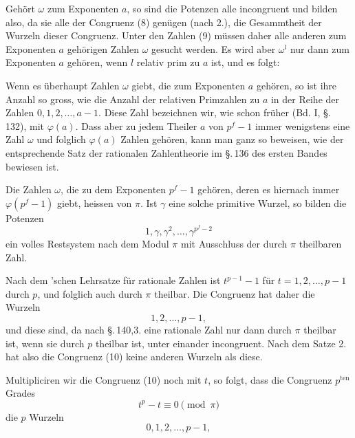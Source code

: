 Gehört $\omega$ zum Exponenten $a$, so sind die Potenzen
alle incongruent und bilden also, da sie alle der Congruenz (8) genügen (nach 2.), die Gesammtheit der Wurzeln dieser Congruenz. Unter den Zahlen (9) müssen daher alle anderen zum Exponenten $a$ gehörigen Zahlen $\omega$ gesucht werden. Es wird aber $\omega^l$ nur dann zum Exponenten $a$ gehören, wenn $l$ relativ prim zu $a$ ist, und es folgt:

Wenn es überhaupt Zahlen $\omega$ giebt, die zum Exponenten $a$ gehören, so ist ihre Anzahl so gross, wie die Anzahl der relativen Primzahlen zu $a$ in der Reihe der Zahlen $0, 1, 2, \ldots, a-1$. Diese Zahl bezeichnen wir, wie schon früher (Bd. I, \S.\,132), mit $\varphi(a)$. Dass aber zu jedem Theiler $a$ von $p^f-1$ immer wenigstens eine Zahl $\omega$ und folglich $\varphi(a)$ Zahlen gehören, kann man ganz so beweisen, wie der entsprechende Satz der rationalen Zahlentheorie im \S.\,136 des ersten Bandes bewiesen ist.

Die Zahlen $\omega$, die zu dem Exponenten $p^f-1$ gehören, deren es hiernach immer $\varphi(p^f-1)$ giebt, heissen  von $\pi$. Ist $\gamma$ eine solche primitive Wurzel, so bilden die Potenzen
\[ 1, \gamma, \gamma^2, \ldots, \gamma^{p^f-2} \]
ein volles Restsystem nach dem Modul $\pi$ mit Ausschluss der durch $\pi$ theilbaren Zahl.

Nach dem 'schen Lehrsatze für rationale Zahlen ist $t^{p-1}-1$ für $t = 1, 2, \ldots, p-1$ durch $p$, und folglich auch durch $\pi$ theilbar. Die Congruenz
hat daher die Wurzeln
\[ 1, 2, \ldots, p-1, \]
und diese sind, da nach \S.\,140,3. eine rationale Zahl nur dann durch $\pi$ theilbar ist, wenn sie durch $p$ theilbar ist, unter einander incongruent. Nach dem Satze 2. hat also die Congruenz (10) keine anderen Wurzeln als diese.

Multipliciren wir die Congruenz (10) noch mit $t$, so folgt, dass die Congruenz $p^{\text{ten}}$ Grades
\[ t^p - t \equiv 0 \pmod{\pi} \]
die $p$ Wurzeln
\[ 0, 1, 2, \ldots, p-1, \]
